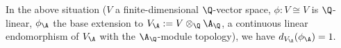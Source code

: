 \begin{theorem}
    \label{MeasureTheory.addHaarScalarFactor_tensor_adeles_eq_one}
    \leanok
    In the above situation ($V$ a finite-dimensional $\Q$-vector space, $\phi:V\cong V$ is
    $\Q$-linear, $\phi_{\A}$ the base extension to $V_{\A}:=V\otimes_{\Q}{\A_{\Q}}$, a continuous linear
    endomorphism of $V_{\A}$ with the $\A_{\Q}$-module topology), we have $d_{V_{\A}}(\phi_{\A})=1.$
  \end{theorem}
